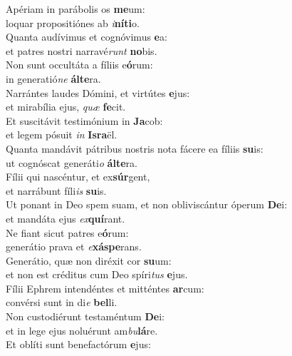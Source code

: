 \evenverse Apériam in parábolis os \textbf{me}um:~\*\\
\evenverse loquar propositiónes ab \textit{i}\textbf{ní}\textbf{ti}o.\\
\oddverse Quanta audívimus et cognóvimus \textbf{e}a:~\*\\
\oddverse et patres nostri narravé\textit{runt} \textbf{no}bis.\\
\evenverse Non sunt occultáta a fíliis e\textbf{ó}rum:~\*\\
\evenverse in generatió\textit{ne} \textbf{ál}\textbf{te}ra.\\
\oddverse Narrántes laudes Dómini, et virtútes \textbf{e}jus:~\*\\
\oddverse et mirabília ejus, \textit{quæ} \textbf{fe}cit.\\
\evenverse Et suscitávit testimónium in \textbf{Ja}cob:~\*\\
\evenverse et legem pósuit \textit{in} \textbf{Is}\textbf{ra}ël.\\
\oddverse Quanta mandávit pátribus nostris nota fácere ea fíliis \textbf{su}is:~\*\\
\oddverse ut cognóscat generáti\textit{o} \textbf{ál}\textbf{te}ra.\\
\evenverse Fílii qui nascéntur, et ex\textbf{súr}gent,~\*\\
\evenverse et narrábunt fíli\textit{is} \textbf{su}is.\\
\oddverse Ut ponant in Deo spem suam, et non obliviscántur óperum \textbf{De}i:~\*\\
\oddverse et mandáta ejus \textit{ex}\textbf{quí}rant.\\
\evenverse Ne fiant sicut patres e\textbf{ó}rum:~\*\\
\evenverse generátio prava et \textit{e}\textbf{xá}\textbf{spe}rans.\\
\oddverse Generátio, quæ non diréxit cor \textbf{su}um:~\*\\
\oddverse et non est créditus cum Deo spíri\textit{tus} \textbf{e}jus.\\
\evenverse Fílii Ephrem intendéntes et mitténtes \textbf{ar}cum:~\*\\
\evenverse convérsi sunt in di\textit{e} \textbf{bel}li.\\
\oddverse Non custodiérunt testaméntum \textbf{De}i:~\*\\
\oddverse et in lege ejus noluérunt am\textit{bu}\textbf{lá}re.\\
\evenverse Et oblíti sunt benefactórum \textbf{e}jus:~\*\\
